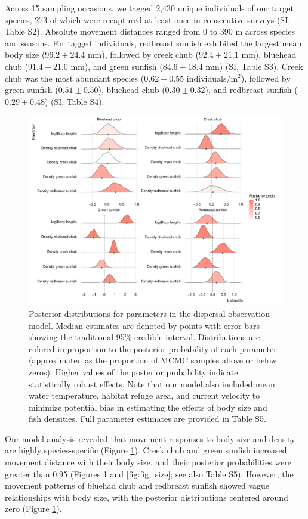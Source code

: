 \documentclass[11pt, class=article, crop=false]{standalone}
\begin{document}
Across 15 sampling occasions, we tagged 2,430 unique individuals of our target species, 273 of which were recaptured at least once in consecutive surveys (SI, Table S2).  
Absolute movement distances ranged from 0 to 390 m across species and seasons.  
For tagged individuals, redbreast sunfish exhibited the largest mean body size ($96.2 \pm 24.4$ mm), followed by creek chub ($92.4 \pm 21.1$ mm), bluehead chub ($91.4 \pm 21.0$ mm), and green sunfish ($84.6 \pm 18.4$ mm) (SI, Table S3).
Creek chub was the most abundant species ($0.62 \pm 0.55$ individuals/m$^2$), followed by green sunfish ($0.51 \pm 0.50$), bluehead chub ($0.30 \pm 0.32$), and redbreast sunfish ($0.29 \pm 0.48$) (SI, Table S4).  

\begin{figure}
    \centering
    \includegraphics[width=0.9\linewidth]{output/fig_est.pdf}
    \caption{Posterior distributions for parameters in the dispersal-observation model. Median estimates are denoted by points with error bars showing the traditional 95\% credible interval. 
    Distributions are colored in proportion to the posterior probability of each parameter (approximated as the proportion of MCMC samples above or below zeros).
    Higher values of the posterior probability indicate statistically robust effects.
    Note that our model also included mean water temperature, habitat refuge area, and current velocity to minimize potential bias in estimating the effects of body size and fish densities.
    Full parameter estimates are provided in Table S5.}
    \label{fig:fig_est}
\end{figure}

Our model analysis revealed that movement responses to body size and density are highly species-specific (Figure \ref{fig:fig_est}). Creek chub and green sunfish increased movement distance with their body size, and their posterior probabilities were greater than 0.95 (Figures \ref{fig:fig_est} and \ref{fig:fig_size}; see also Table S5). 
However, the movement patterns of bluehad chub and redbreast sunfish showed vague relationships with body size, with the posterior distributions centered around zero (Figure \ref{fig:fig_est}).
\end{document}
